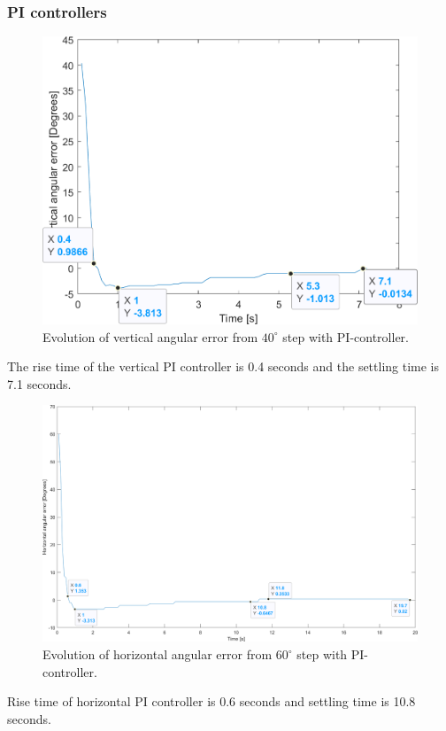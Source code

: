\subsubsection{PI controllers}
\label{sec:simon13}
\begin{figure}[h]
\centering
\includegraphics[width=\linewidth]{sections/assets/Vertical_PI_controller.png}
\caption{Evolution of vertical angular error from \(40^{\circ}\) step with PI-controller.}
\label{vert_PI}
\end{figure}
The rise time of the vertical PI controller is 0.4 seconds and the settling time is 7.1 seconds.
\begin{figure}[h]
\centering
\includegraphics[width=\linewidth]{sections/assets/Horizontal_PI_controller.png}
\caption{Evolution of horizontal angular error from \(60^{\circ}\) step with PI-controller.}
\label{Horizontal_PI}
\end{figure}
Rise time of horizontal PI controller is 0.6 seconds and settling time is 10.8 seconds.

